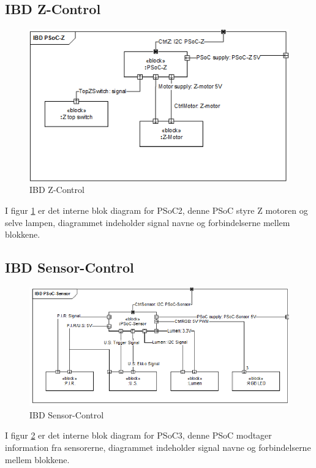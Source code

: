 \subsection{IBD Z-Control}
\begin{figure}[H] \centering
    \includegraphics[width=\textwidth]{0_Filer/Figuer/5_HW_Design/IBD_PSoC2_vers3.png}
    \caption{IBD Z-Control}
    \label{fig:ibdZ}
\end{figure}
I figur \ref{fig:ibdZ} er det interne blok diagram for PSoC2, denne PSoC styre Z motoren og selve lampen, diagrammet indeholder signal navne og forbindelserne mellem blokkene.

\subsection{IBD Sensor-Control}
\begin{figure}[H] \centering
    \includegraphics[width=\textwidth]{0_Filer/Figuer/5_HW_Design/IBD_PSoC3_vers3.png}
    \caption{IBD Sensor-Control}
    \label{fig:ibdSensor}
\end{figure}
I figur \ref{fig:ibdSensor} er det interne blok diagram for PSoC3, denne PSoC modtager information fra sensorerne, diagrammet indeholder signal navne og forbindelserne mellem blokkene.



